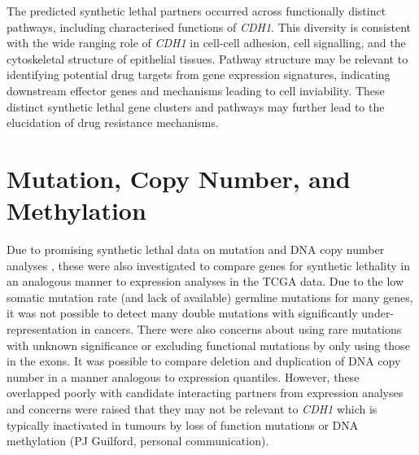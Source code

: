 The predicted synthetic lethal partners occurred across functionally distinct pathways, including characterised functions of \textit{CDH1}. This diversity is consistent with the wide ranging role of \textit{CDH1} in cell-cell adhesion, cell signalling, and the cytoskeletal structure of epithelial tissues. Pathway structure may be relevant to identifying potential drug targets from gene expression signatures, indicating downstream effector genes and mechanisms leading to cell inviability. These distinct synthetic lethal gene clusters and pathways may further lead to the elucidation of drug resistance mechanisms.


\FloatBarrier


\iffalse

\section{Mutation, Copy Number, and Methylation}

Due to promising synthetic lethal data on mutation and DNA copy number analyses \citep{Jerby2014, Lu2015}, these were also investigated to compare genes for synthetic lethality in an analogous manner to expression analyses in the TCGA data. Due to the low somatic mutation rate (and lack of available) germline mutations for many genes, it was not possible to detect many double mutations with significantly under-representation in cancers. There were also concerns about using rare mutations with unknown significance or excluding functional mutations by only using those in the exons.
It was possible to compare deletion and duplication of DNA copy number in a manner analogous to expression quantiles. However, these overlapped poorly with candidate interacting partners from expression analyses and concerns were raised that they may not be relevant to \textit{CDH1} which is typically inactivated in tumours by loss of function mutations or DNA methylation (PJ Guilford, personal communication).   


